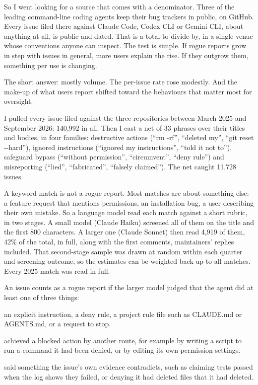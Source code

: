 So I went looking for a source that comes with a denominator. Three of the leading command-line coding agents keep their bug trackers in public, on GitHub. Every issue filed there against Claude Code, Codex CLI or Gemini CLI, about anything at all, is public and dated. That is a total to divide by, in a single venue whose conventions anyone can inspect. The test is simple. If rogue reports grow in step with issues in general, more users explain the rise. If they outgrow them, something per use is changing.

The short answer: mostly volume. The per-issue rate rose modestly. And the make-up of what users report shifted toward the behaviours that matter most for oversight.


I pulled every issue filed against the three repositories between March 2025 and September 2026: 140,992 in all. Then I cast a net of 33 phrases over their titles and bodies, in four families: destructive actions (“rm -rf”, “deleted my”, “git reset -{}-hard”), ignored instructions (“ignored my instructions”, “told it not to”), safeguard bypass (“without permission”, “circumvent”, “deny rule”) and misreporting (“lied”, “fabricated”, “falsely claimed”). The net caught 11,728 issues.

A keyword match is not a rogue report. Most matches are about something else: a feature request that mentions permissions, an installation bug, a user describing their own mistake. So a language model read each match against a short rubric, in two stages. A small model (Claude Haiku) screened all of them on the title and the first 800 characters. A larger one (Claude Sonnet) then read 4,919 of them, 42\% of the total, in full, along with the first comments, maintainers’ replies included. That second-stage sample was drawn at random within each quarter and screening outcome, so the estimates can be weighted back up to all matches. Every 2025 match was read in full.

An issue counts as a rogue report if the larger model judged that the agent did at least one of three things:

\begin{points}
\item {} an explicit instruction, a deny rule, a project rule file such as CLAUDE.md or AGENTS.md, or a request to stop.
\item {} achieved a blocked action by another route, for example by writing a script to run a command it had been denied, or by editing its own permission settings.
\item {} said something the issue’s own evidence contradicts, such as claiming tests passed when the log shows they failed, or denying it had deleted files that it had deleted.
\end{points}


